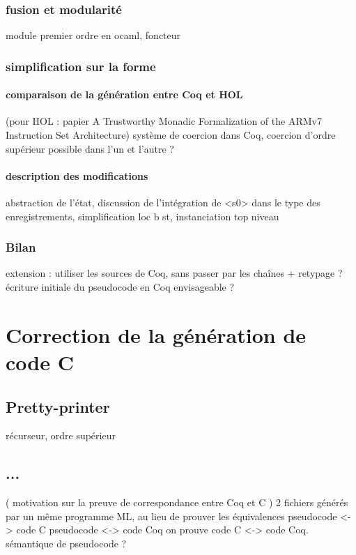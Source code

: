 \documentclass[a4paper, 11pt]{article}
\begin{document}
    \subsubsection{fusion et modularité}
    module premier ordre en ocaml, foncteur
    \subsubsection{simplification sur la forme}
      \paragraph{comparaison de la génération entre Coq et HOL}
      (pour HOL : papier A Trustworthy Monadic Formalization of the
ARMv7 Instruction Set Architecture)
      système de coercion dans Coq, coercion d'ordre supérieur possible dans l'un et l'autre ?
      \paragraph{description des modifications}
      abstraction de l'état, 
      discussion de l'intégration de <s0> dans le type des enregistrements,
      simplification {loc b st}, instanciation top niveau
    \subsubsection{Bilan}
    extension : utiliser les sources de Coq, sans passer par les chaînes + retypage ?
    écriture initiale du pseudocode en Coq envisageable ?

\section{Correction de la génération de code C}
\subsection{Pretty-printer}
récurseur, ordre supérieur
\subsection{...}
  ( motivation sur la preuve de correspondance entre Coq et C )
  2 fichiers générés par un même programme ML, au lieu de prouver les équivalences 
  pseudocode <-> code C
  pseudocode <-> code Coq
  on prouve code C <-> code Coq. sémantique de pseudocode ?
\end{document}

